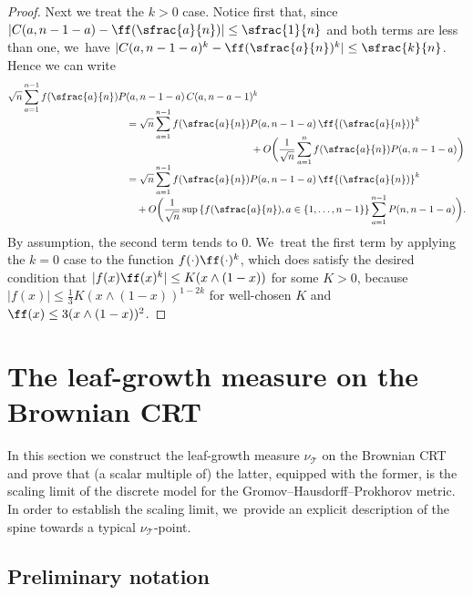 \begin{proof}
Next we treat the $k>0$ case. Notice first that, since $|C(a,n-1-a)-\ff(\sfrac{a}{n})|\leq \sfrac{1}{n}$ and both terms are less than one, we~have $|C(a,n-1-a)^k-\ff(\sfrac{a}{n})^k|\leq \sfrac{k}{n}$. Hence we can write\vspace*{-3pt}
\begin{align*}
\sqrt{n} \sum_{a=1}^{n-1} f{(\sfrac{a}{n})}P&(a,n-1-a)\,C(a,n-a-1)^k\\[
-8pt]
&=\sqrt{n}\sum_{a=1}^{n-1} f{(\sfrac{a}{n})}P(a,n-1-a)\,\ff{(\sfrac{a}{n})}^k\\[-8pt]
&\quad\hspace*{4cm}+O\biggl(\frac1{\sqrt{n}}\sum_{a=1}^n f{(\sfrac{a}{n})}P(a,n-1-a)\biggr) \\[-5pt]
&=\sqrt{n}\sum_{a=1}^{n-1} f{(\sfrac{a}{n})}P(a,n-1-a)\,\ff{(\sfrac{a}{n})}^k\\[-5pt]
&\quad+ O\biggl(\frac1{\sqrt{n}}\sup\left\{f{(\sfrac{a}{n})},a\in\{1,\ldots,n-1\}\right\}\sum_{a=1}^{n-1}P(n,n-1-a)\biggr).
\end{align*}
By assumption, the second term tends to $0$. We~treat the first term by applying the $k=0$ case to the function $f(\cdot)\ff(\cdot)^k$, which does satisfy the desired condition that $|f(x)\ff(x)^k| \leq K(x\wedge (1-x))$ for some $K>0$, because $|f(x)|\leq \frac13K(x\wedge(1-x))^{1-2k}$ for well-chosen $K$ and $\ff(x) \leq 3 (x\wedge (1-x))^2$.
\end{proof}

\section{The leaf-growth measure on the Brownian CRT}\label{section:convergence}

In this section we construct the leaf-growth measure $\nu_\mathcal{T}$ on the Brownian CRT and prove that (a scalar multiple of) the latter, equipped with the former, is the scaling limit of the discrete model for the Gromov--Hausdorff--Prokhorov metric. In order to establish the scaling limit, we~provide an explicit description of the spine towards a typical $\nu_\mathcal{T}$-point.

\subsection{Preliminary notation}

